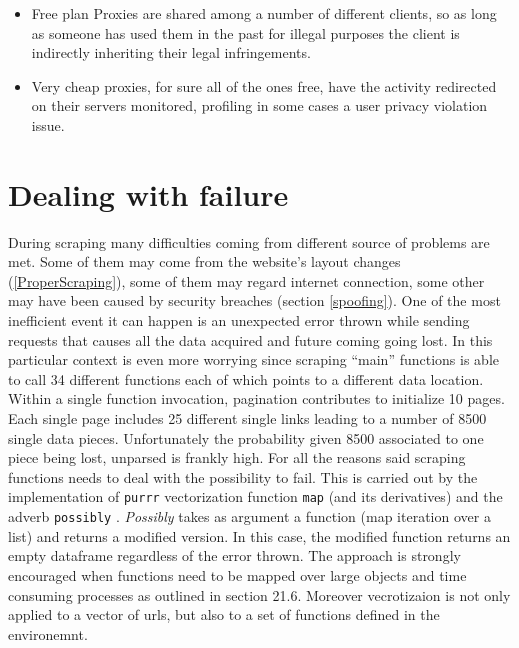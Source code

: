 \documentclass[
  12pt,
  a4paper,
  oneside]{book}
\newcommand{\passthrough}[1]{#1}
\providecommand{\tightlist}{%
  \setlength{\itemsep}{0pt}\setlength{\parskip}{0pt}}
\theoremstyle{definition}
\theoremstyle{definition}
\theoremstyle{definition}
\theoremstyle{remark}
\begin{document}
\begin{itemize}
\tightlist
\item
  Free plan Proxies are shared among a number of different clients, so as long as someone has used them in the past for illegal purposes the client is indirectly inheriting their legal infringements.
\item
  Very cheap proxies, for sure all of the ones free, have the activity redirected on their servers monitored, profiling in some cases a user privacy violation issue.
\end{itemize}

\hypertarget{possibly}{%
\section{Dealing with failure}\label{possibly}}

During scraping many difficulties coming from different source of problems are met. Some of them may come from the website's layout changes (\ref{ProperScraping}), some of them may regard internet connection, some other may have been caused by security breaches (section \ref{spoofing}).
One of the most inefficient event it can happen is an unexpected error thrown while sending requests that causes all the data acquired and future coming going lost. In this particular context is even more worrying since scraping ``main'' functions is able to call 34 different functions each of which points to a different data location. Within a single function invocation, pagination contributes to initialize 10 pages. Each single page includes 25 different single links leading to a number of 8500 single data pieces. Unfortunately the probability given 8500 associated to one piece being lost, unparsed is frankly high.
For all the reasons said scraping functions needs to deal with the possibility to fail. This is carried out by the implementation of \passthrough{\lstinline!purrr!} vectorization function \passthrough{\lstinline!map!} (and its derivatives) and the adverb \passthrough{\lstinline!possibly!} \citet{possibly}. \emph{Possibly} takes as argument a function (map iteration over a list) and returns a modified version. In this case, the modified function returns an empty dataframe regardless of the error thrown. The approach is strongly encouraged when functions need to be mapped over large objects and time consuming processes as outlined in \citet{Rdatascience} section 21.6. Moreover vecrotizaion is not only applied to a vector of urls, but also to a set of functions defined in the environemnt.
\end{document}
